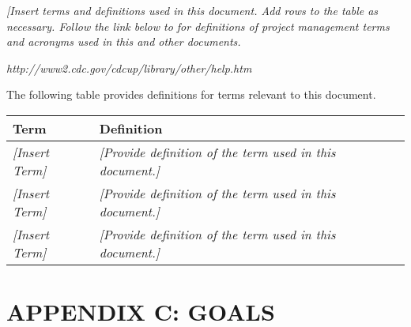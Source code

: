 \documentclass[a4paper, 11pt]{article}
\begin{document}
\emph{{[}Insert terms and definitions used in this document. Add rows to
the table as necessary. Follow the link below to for definitions of
project management terms and acronyms used in this and other documents.}

\emph{http://www2.cdc.gov/cdcup/library/other/help.htm}

The following table provides definitions for terms relevant to this
document.

\begin{longtable}[]{@{}ll@{}}
\toprule
\textbf{Term} & \textbf{Definition}\tabularnewline
\midrule
\endhead
\emph{{[}Insert Term{]}} & \emph{{[}Provide definition of the term used
in this document.{]}}\tabularnewline
\emph{{[}Insert Term{]}} & \emph{{[}Provide definition of the term used
in this document.{]}}\tabularnewline
\emph{{[}Insert Term{]}} & \emph{{[}Provide definition of the term used
in this document.{]}}\tabularnewline
\bottomrule
\end{longtable}

\section{APPENDIX C: GOALS}
\end{document}
